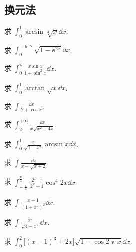 \subsection{换元法}

	\begin{ti}
		求 $\int_{0}^{1} \arcsin \sqrt[3]{x} \dd{x}$.
	\end{ti}

	\begin{ti}
		求 $\int_{0}^{- \ln 2} \sqrt{1 - \ee^{2x}} \dd{x}$.
	\end{ti}

	\begin{ti}
		求 $\int_{0}^{\uppi} \frac{x \sin x}{1 + \sin^{2}x} \dd{x}$.
	\end{ti}

	\begin{ti}
		求 $\int_{0}^{1} \arctan \sqrt{x} \dd{x}$.
	\end{ti}

	\begin{ti}
		求 $\int \frac{\dd{x}}{2 + \cos x}$.
	\end{ti}

	\begin{ti}
		求 $\int_{2}^{+\infty} \frac{\dd{x}}{x \sqrt{x^{2} + 4x}}$.
	\end{ti}

	\begin{ti}
		求 $\int_{0}^{1} \frac{x}{\sqrt{1 - x^{2}}} \arcsin x \dd{x}$.
	\end{ti}

	\begin{ti}
		求 $\int \frac{\dd{x}}{x + \sqrt{x + 2}}$.
	\end{ti}

	\begin{ti}
		求 $\int_{-\frac{\uppi}{4}}^{\frac{\uppi}{4}} \frac{2^{x - 1}}{2^{x} + 1} \cos^{4}2x \dd{x}$.
	\end{ti}

	\begin{ti}
		求 $\int \frac{x + 1}{\left( 1 + x^{2} \right)^{2}} \dd{x}$.
	\end{ti}

	\begin{ti}
		求 $\int \frac{x^{2}}{\sqrt{4 - x^{2}}} \dd{x}$.
	\end{ti}

	\begin{ti}
		求 $\int_{0}^{2} \bigl[ (x - 1)^{3} + 2x \bigr] \sqrt{1 - \cos 2 \uppi x} \dd{x}$.
	\end{ti}

